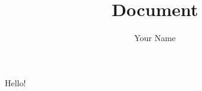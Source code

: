 \documentclass[10pt]{extarticle}
\title{Document}
\author{Your Name}
\date{}
\begin{document}
\maketitle

Hello!
\end{document}
